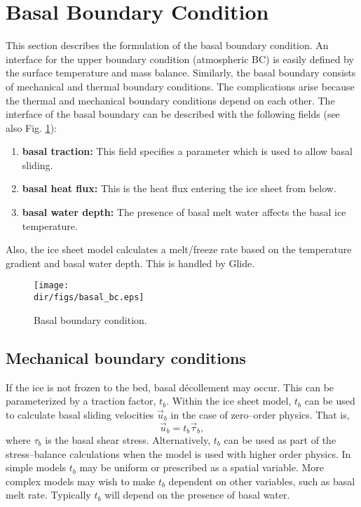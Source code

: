 \section{Basal Boundary Condition}
This section describes the formulation of the basal boundary condition.
An interface for the upper boundary condition (atmospheric BC) is easily defined by the surface temperature and mass balance. Similarly, the basal boundary consists of mechanical and thermal boundary conditions. The complications arise because the thermal and mechanical boundary conditions depend on each other. The interface of the basal boundary can be described with the following fields (see also Fig. \ref{num.fig.basal_bc}):
\begin{enumerate}
\item \textbf{basal traction:} This field specifies a parameter which is used to allow basal sliding.
\item \textbf{basal heat flux:} This is the heat flux entering the ice sheet from below.
\item \textbf{basal water depth:} The presence of basal melt water affects the basal ice temperature.
\end{enumerate}
Also, the ice sheet model calculates a melt/freeze rate based on the temperature gradient and basal water depth. This is handled by Glide.

\begin{figure}[htbp]
  \centering
  \texttt{[image: \\dir/figs/basal\_bc.eps]}
  \caption{Basal boundary condition.}
  \label{num.fig.basal_bc}
\end{figure}

\subsection{Mechanical boundary conditions}
If the ice is not frozen to the bed, basal d\'{e}collement may occur. This can be parameterized by a traction factor, $t_b$. 
Within the ice sheet model, $t_b$ can be used to calculate basal sliding velocities $\vec{u}_b$ in the case of zero--order physics. That is,
\begin{equation}
  \vec{u}_b=t_b\vec{\tau}_b,
\end{equation}
where $\tau_b$ is the basal shear stress. Alternatively, $t_b$ can be used as part of the stress--balance calculations when the model is used with higher order physics. In simple models $t_b$ may be uniform or prescribed as a spatial variable. More complex models may wish to make $t_b$ dependent on other variables, such as basal melt rate. Typically $t_b$ will depend on the presence of basal water.

